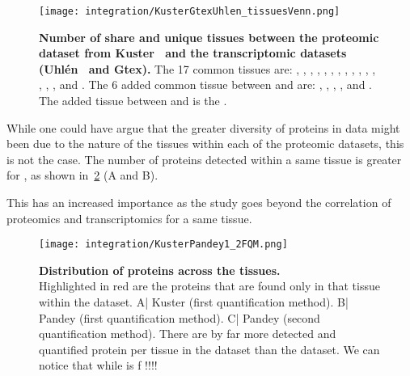 \begin{figure}%
    \texttt{[image: integration/KusterGtexUhlen\_tissuesVenn.png]}
    \centering
    \caption[Number of share and unique tissues between the proteomic dataset
    from Kuster \etal\ and the transcriptomic datasets (Uhlén \etal\ and
    Gtex)]{\label{fig:VennTissueKusterGtexUhlen}\textbf{Number of share and unique
    tissues between the proteomic dataset from Kuster \etal\ and the
    transcriptomic datasets (Uhlén \etal\ and Gtex).} The 17 common tissues are:
    , , ,  ,
    , , , ,
    , , , ,
    , , ,  and
    . The 6 added common tissue between  and
     are: , ,
    , ,  and .
    The added tissue between  and  is the
    .}
\end{figure}

While one could have argue that the greater diversity of proteins in
 data might been due to the nature of the tissues within
each of the proteomic datasets, this is not the case. The number of proteins
detected within a same tissue is greater for  ,
as shown in~\cref{fig:KusterPandeyFQM} (A and B).

This has an increased importance as the study goes beyond the correlation of
proteomics and transcriptomics for a same tissue.

\begin{figure}%
    \texttt{[image: integration/KusterPandey1\_2FQM.png]}\centering
    \caption[Distribution of proteins across the tissues]
    {\label{fig:KusterPandeyFQM}\textbf{Distribution of proteins across
    the tissues.}\\Highlighted in red are the proteins that are found only in that
    tissue within the dataset. A| Kuster (first quantification method).
    B| Pandey (first quantification method).
    C| Pandey (second quantification method).
    There are by far more detected and quantified protein per tissue in the
     dataset than the  dataset. We
    can notice that while  is f !!!! 
    }
\end{figure}

